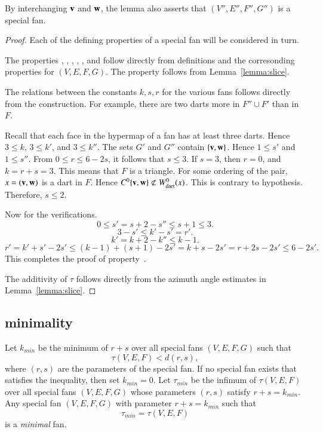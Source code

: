 By interchanging ${\mathbf v}$ and ${\mathbf w}$, the lemma also asserts that $(V'',E'',F'',G'')$ is a special fan.

\begin{proof}  Each of the defining properties of a special fan will be considered in turn.

The properties , , , , , and  follow directly from definitions and the corresonding properties for $(V,E,F,G)$.
The property  follows from Lemma~\ref{lemma:slice}.

The relations between the constants $k,s,r$ for the various fans follows directly from the construction.
For example, there are two darts more in $F''\cup F'$ than in $F$.  

  Recall that each face in the hypermap of a fan has at least three darts.  Hence $3\le k$, $3\le k'$, and $3\le k''$.
The sets $G'$ and $G''$ contain $\{{\mathbf v},{\mathbf w}\}$.  Hence $1\le s'$ and $1\le s''$.
From $0\le r\le 6 - 2s$, it follows that $s\le 3$.  If $s=3$, then $r=0$, and $k=r+s=3$.  This means that $F$ is a triangle.  For some ordering of the pair, $x=({\mathbf v},{\mathbf w})$ is a dart in $F$.
Hence  $C^0\{{\mathbf v},{\mathbf w}\} \not\subset W^0_{\text{dart}}(x)$.  This is contrary to hypothesis.  Therefore, $s\le 2$.

Now for the verifications.
$$0\le s' = s + 2 - s'' \le s+1\le 3.$$
$$3-s'\le k'-s' = r'.$$
$$k' = k + 2 - k'' \le k-1.$$
$$
r'= k'+s' - 2 s' \le (k-1) + (s+1) - 2s' =k+s - 2s' = r + 2s -2s' \le 6 - 2s'.
$$
This completes the proof of property~.

The additivity of $\tau$ follows directly from the azimuth angle estimates in Lemma~\ref{lemma:slice}.
\end{proof}



\subsection{minimality}


\begin{definition}
Let $k_{min}$ be the minimum of $r+s$ over
all special fans $(V,E,F,G)$ such that 
\begin{equation}\label{eqn:kmin}
\tau(V,E,F) < d (r,s),
\end{equation}
where $(r,s)$ are the parameters of the special fan.
If no special fan exists that satisfies the inequality, then set $k_{min}=0$.
Let $\tau_{min}$ be the infimum of $\tau(V,E,F)$ over all special fans
$(V,E,F,G)$ whose parameters $(r,s)$ satisfy $r+s=k_{min}$.
Any special fan $(V,E,F,G)$ with parameter $r+s=k_{min}$ such that
$$
\tau_{min}= \tau(V,E,F)
$$
is a {\it minimal}  fan.
\end{definition}


